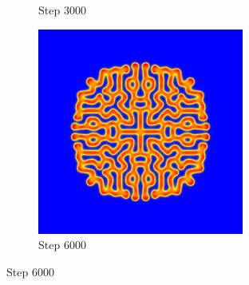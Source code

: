 \documentclass[9pt]{IEEEtran} %
\begin{document}
\begin{figure}[H]
\begin{subfigure}[b]{0.32\columnwidth}
        \caption{Step 3000} %
        \label{fig:video_b}
    \end{subfigure}
    \hfill
    \begin{subfigure}[b]{0.32\columnwidth}
        \includegraphics[width=\textwidth]{frame_00120.png} %
        \caption{Step 6000} %
        \label{fig:video_c}
    \end{subfigure}

    \vspace{2mm} %


\end{figure}
\end{document}
